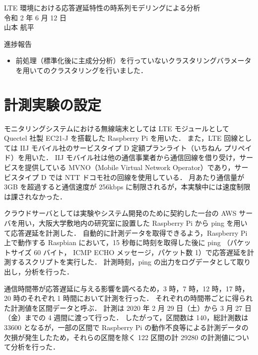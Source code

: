 \documentclass[a4j]{jarticle}
\begin{document}
\begin{table}[t]
\begin{center}
{\large LTE 環境における応答遅延特性の時系列モデリングによる分析}\\
令和 2 年 6 月 12 日\\
山本 航平
\end{center}
\end{table}

進捗報告
\begin{itemize}
\item 前処理（標準化後に主成分分析）を行っていないクラスタリングバラメータを用いてのクラスタリングを行いました．
\end{itemize}

\section{計測実験の設定}
モニタリングシステムにおける無線端末としては LTE モジュールとして Quectel 社製 EC21-J を搭載した Raspberry Pi を用いた．
また，LTE 回線としては IIJ モバイル社のサービスタイプ D 定額プランライト（いちねん プリペイド）を用いた．
IIJ モバイル社は他の通信事業者から通信回線を借り受け，サービスを提供している MVNO（Mobile Virtual Network Operator）であり，サービスタイプ D では NTT ドコモ社の回線を使用している．
月あたり通信量が 3GB を超過すると通信速度が 256kbps に制限されるが，本実験中には速度制限は課されなかった．

クラウドサーバとしては実験やシステム開発のために契約した一台の AWS サーバを用い，大阪大学敷地内の研究室に設置した Raspberry Pi から ping を用いて応答遅延を計測した．
自動的に計測データを取得できるよう，Raspberry Pi 上で動作する Raspbian において，15 秒毎に時刻を取得した後に ping （パケットサイズ 60 バイト， ICMP ECHO メッセージ，パケット数 1）で応答遅延を計測するスクリプトを実行した．
計測時刻，ping の出力をログデータとして取り出し，分析を行った．

通信時間帯が応答遅延に与える影響を調べるため，3 時，7 時，12 時，17 時，20 時のそれぞれ 1 時間において計測を行った．
それぞれの時間帯ごとに得られた計測値を区間データと呼ぶ．
計測は 2020 年 2 月 29 日（土）から 3 月 27 日（金）までの 4 週間に渡って行った．
したがって，区間数は 140，総計測数は 33600 となるが，一部の区間で Raspberry Pi の動作不良等による計測データの欠損が発生したため，それらの区間を除く 122 区間の計 29280 の計測値について分析を行った．
\end{document}
